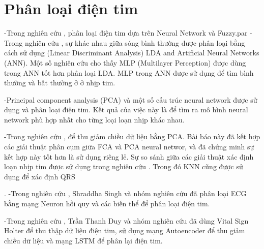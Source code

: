 \section{Phân loại điện tim}
-Trong nghiên cứu \cite{11}, phân loại điện tim dựa trên Neural Network và Fuzzy.par
-Trong nghiên cứu \cite{12}, sự khác nhau giữa sóng bình thường được phân loại bằng cách sử dụng (Linear Discriminant Analysis) LDA and Artificial Neural Networks (ANN). Một số nghiên cứu cho thấy MLP (Multilayer Perception) được dùng trong ANN tốt hơn phân loại LDA. MLP trong ANN được sử dụng để tìm bình thường và bất thường ở ở nhịp tim.\par
-Principal component analysis (PCA) và một số cấu trúc neural network được sử dụng và phân loại điện tim. Kết quả của việc này là để tìm ra mô hình neural network phù hợp nhất cho từng loại loạn nhịp khác nhau.\par
-Trong nghiên cứu \cite{13}, để thu giảm chiều dữ liệu bằng PCA. Bài báo này đã kết hợp các giải thuật phân cụm giữa FCA và PCA neural networ, và đã chứng minh sự kết hợp này tốt hơn là sử dụng riêng lẻ. Sự so sánh giữa các giải thuật xác định loạn nhịp tim được sử dụng trong nghiên cứu \cite{14}. Trong đó KNN cũng được sử dụng để xác định QRS\par.
-Trong nghiên cứu \cite{rnn}, Shraddha Singh và nhóm nghiên cứu đã phân loại ECG bằng mạng Neuron hồi quy và các biến thể để phân loại điện tim.\par
-Trong nghiên cứu \cite{mohinhchinh}, Trần Thanh Duy và nhóm nghiên cứu đã dùng Vital Sign Holter để thu thập dữ liệu điện tim, sử dụng mạng Autoencoder để thu giảm chiều dữ liệu và mạng LSTM để phân lại điện tim.

